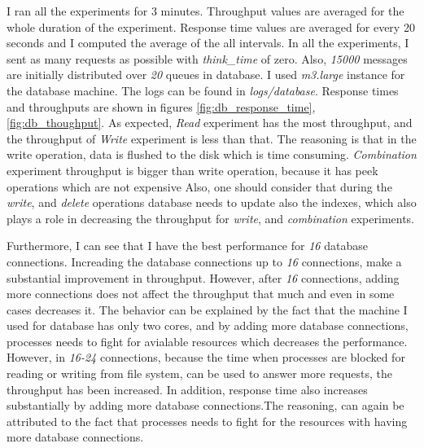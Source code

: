 \documentclass[11pt]{article}
\begin{document}
I ran all the experiments for 3 minutes. Throughput values are averaged for the 
whole duration of the experiment. Response time values are averaged for every
20 seconds and I computed the average of the all intervals. In all the experiments, 
I sent as many requests as possible with \emph{think\_time} of zero.
Also, \emph{15000} messages are initially
distributed over \emph{20} queues in database. I used \emph{m3.large} instance for the database 
machine. The logs can be found in \emph{logs/database}. Response times and throughputs
are shown in figures \ref{fig:db_response_time}, \ref{fig:db_thoughput}. As expected,
\emph{Read} experiment has the most throughput, and the throughput of \emph{Write} 
experiment is less than that. The reasoning is that in the write operation, data is flushed 
to the disk which is time consuming. \emph{Combination} experiment throughput 
is bigger than write operation, because it has peek operations which are not expensive
Also, one should consider that during the \emph{write}, and \emph{delete} operations
database needs to update also the indexes, which also plays a role in decreasing the 
throughput for \emph{write}, and \emph{combination} experiments. 

Furthermore, I can see that I have the best performance for \emph{16} database connections.
Increading the database connections up to \emph{16} connections, make a substantial
improvement in throughput. However, after \emph{16} connections, adding more connections
does not affect the throughput that much and even in some cases decreases it. The behavior
can be explained by the fact that the machine I used for database has only two cores, and 
by adding more database connections, processes needs to fight for avialable resources
which decreases the performance. However, in \emph{16-24} connections, because the 
time when processes are blocked for reading or writing from file system,
can be used to answer more requests, the throughput has been increased.
In addition, response time also increases substantially by adding more database 
connections.The reasoning, can again be attributed to the fact that processes needs to 
fight for the resources with having more database connections. 
\end{document}
